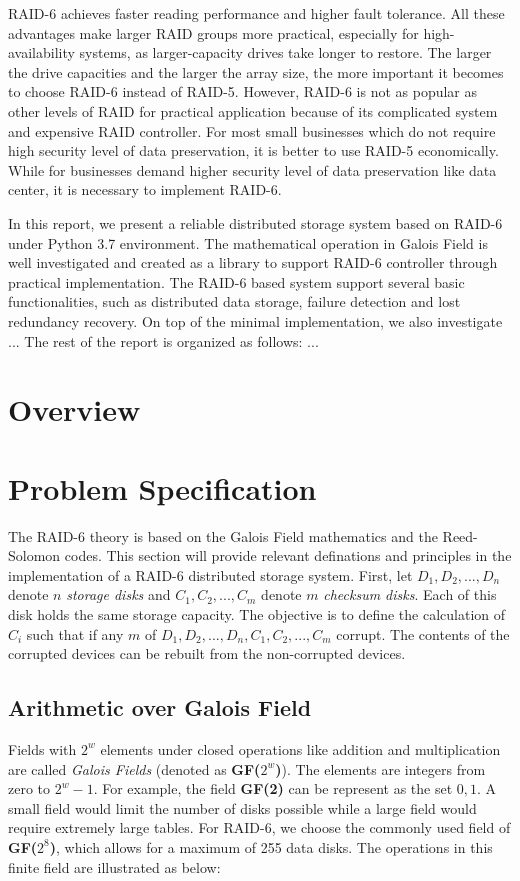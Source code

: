 \documentclass[conference]{IEEEtran}
\begin{document}
RAID-6 achieves faster reading performance and higher fault tolerance. All these advantages make larger RAID groups more practical, especially for high-availability systems, as larger-capacity drives take longer to restore. The larger the drive capacities and the larger the array size, the more important it becomes to choose RAID-6 instead of RAID-5. However, RAID-6 is not as popular as other levels of RAID for practical application because of its complicated system and expensive RAID controller. For most small businesses which do not require high security level of data preservation, it is better to use RAID-5 economically. While for businesses demand higher security level of data preservation like data center, it is necessary to implement RAID-6.

In this report, we present a reliable distributed storage system based on RAID-6 under Python 3.7 environment. The mathematical operation in Galois Field is well investigated and created as a library to support RAID-6 controller through practical implementation. The RAID-6 based system support several basic functionalities, such as distributed data storage, failure detection and lost redundancy recovery. On top of the minimal implementation, we also investigate ...
The rest of the report is organized as follows: ...

\section{Overview}


\section{Problem Specification}
The RAID-6 theory is based on the Galois Field mathematics and the Reed-Solomon codes. This section will provide relevant definations and principles in the implementation of a RAID-6 distributed storage system. First, let $D_1, D_2, ... , D_n$ denote $n$ \emph{storage disks} and $C_1, C_2, ... , C_m$ denote $m$ \emph{checksum disks}. Each of this disk holds the same storage capacity. The objective is to define the calculation of $C_i$ such that if any $m$ of $D_1, D_2, ... , D_n, C_1, C_2, ... , C_m$ corrupt. The contents of the corrupted devices can be rebuilt from the non-corrupted devices.

\subsection{Arithmetic over Galois Field}
Fields with $2^w$ elements under closed operations like addition and multiplication are called \emph{Galois Fields} (denoted as \textbf{GF($2^w$)}). The elements are integers from zero to $2^w-1$. For example, the field \textbf{GF(2)} can be represent as the set ${0,1}$. A small field would limit the number of disks possible while a large field would require extremely large tables. For RAID-6, we choose the commonly used field of \textbf{GF($2^8$)}, which allows for a maximum of 255 data disks. The operations in this finite field are illustrated as below:
\end{document}

